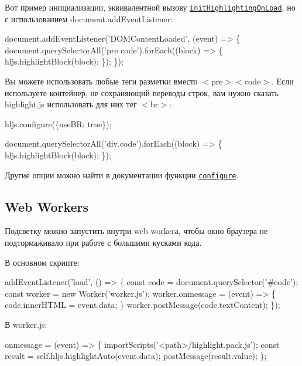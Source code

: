 Вот пример инициализации, эквивалентной вызову \href{http://highlightjs.readthedocs.io/en/latest/api.html#inithighlightingonload}{\tt {\ttfamily init\+Highlighting\+On\+Load}}, но с использованием {\ttfamily document.\+add\+Event\+Listener}\+:


\begin{DoxyCode}
document.addEventListener('DOMContentLoaded', (event) => \{
  document.querySelectorAll('pre code').forEach((block) => \{
    hljs.highlightBlock(block);
  \});
\});
\end{DoxyCode}


Вы можете использовать любые теги разметки вместо {\ttfamily $<$pre$>$$<$code$>$}. Если используете контейнер, не сохраняющий переводы строк, вам нужно сказать highlight.\+js использовать для них тег {\ttfamily $<$br$>$}\+:


\begin{DoxyCode}
hljs.configure(\{useBR: true\});

document.querySelectorAll('div.code').forEach((block) => \{
  hljs.highlightBlock(block);
\});
\end{DoxyCode}


Другие опции можно найти в документации функции \href{http://highlightjs.readthedocs.io/en/latest/api.html#configure-options}{\tt {\ttfamily configure}}.

\subsection*{Web Workers}

Подсветку можно запустить внутри web worker\textquotesingle{}а, чтобы окно браузера не подтормаживало при работе с большими кусками кода.

В основном скрипте\+:


\begin{DoxyCode}
addEventListener('load', () => \{
  const code = document.querySelector('#code');
  const worker = new Worker('worker.js');
  worker.onmessage = (event) => \{ code.innerHTML = event.data; \}
  worker.postMessage(code.textContent);
\});
\end{DoxyCode}


В worker.\+js\+:


\begin{DoxyCode}
onmessage = (event) => \{
  importScripts('<path>/highlight.pack.js');
  const result = self.hljs.highlightAuto(event.data);
  postMessage(result.value);
\};
\end{DoxyCode}


